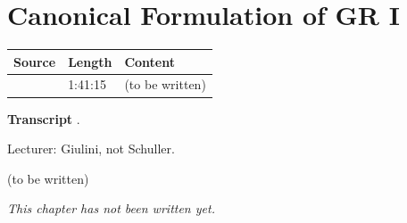 \chapter{Canonical Formulation of GR I}\label{ch:c18}
\begin{paracol}{2}

\begin{sources}
\begin{tabularx}{\linewidth}{@{}l l L@{}}
\toprule
\textbf{Source} & \textbf{Length} & \textbf{Content}\\
\midrule
{} & 1:41:15 & (to be written)\\
\bottomrule
\end{tabularx}

\smallskip
\textbf{Transcript} .
\end{sources}

\begin{coursenote}[Lecturer]
Lecturer: Giulini, not Schuller.
\end{coursenote}

\begin{reading}
(to be written)
\end{reading}

\emph{This chapter has not been written yet.}

\flushside
\end{paracol}
